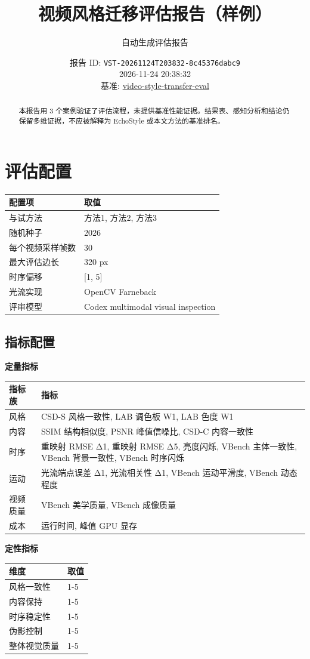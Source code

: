 \documentclass[UTF8,10pt]{ctexart}
\begin{document}
\title{视频风格迁移评估报告（样例）}
\author{自动生成评估报告}
\date{报告 ID: \texttt{VST-20261124T203832-8c45376dabc9} \\ 2026-11-24 20:38:32 \\ 基准: \href{https://github.com/0x0addc001/video-style-transfer-eval}{video-style-transfer-eval}}
\maketitle
\begin{abstract}
本报告用 3 个案例验证了评估流程，未提供基准性能证据。结果表、感知分析和结论仍保留多维证据，不应被解释为 EchoStyle 或本文方法的基准排名。
\end{abstract}
\section*{评估配置}
\begin{tabular}{@{}ll@{}}
\toprule
配置项 & 取值 \\
\midrule
与试方法 & 方法1, 方法2, 方法3 \\
随机种子 & 2026 \\
每个视频采样帧数 & 30 \\
最大评估边长 & 320 px \\
时序偏移 & [1, 5] \\
光流实现 & OpenCV Farneback \\
评审模型 & Codex multimodal visual inspection \\
\bottomrule
\end{tabular}
\subsection*{指标配置}
\noindent\textbf{定量指标}
\begin{tabular}{@{}ll@{}}
\toprule
指标族 & 指标 \\
\midrule
风格 & CSD-S 风格一致性, LAB 调色板 W1, LAB 色度 W1 \\
内容 & SSIM 结构相似度, PSNR 峰值信噪比, CSD-C 内容一致性 \\
时序 & 重映射 RMSE Δ1, 重映射 RMSE Δ5, 亮度闪烁, VBench 主体一致性, VBench 背景一致性, VBench 时序闪烁 \\
运动 & 光流端点误差 Δ1, 光流相关性 Δ1, VBench 运动平滑度, VBench 动态程度 \\
视频质量 & VBench 美学质量, VBench 成像质量 \\
成本 & 运行时间, 峰值 GPU 显存 \\
\bottomrule
\end{tabular}
\noindent\textbf{定性指标}
\begin{tabular}{@{}ll@{}}
\toprule
维度 & 取值 \\
\midrule
风格一致性 & 1-5 \\
内容保持 & 1-5 \\
时序稳定性 & 1-5 \\
伪影控制 & 1-5 \\
整体视觉质量 & 1-5 \\
\bottomrule
\end{tabular}
\end{document}
